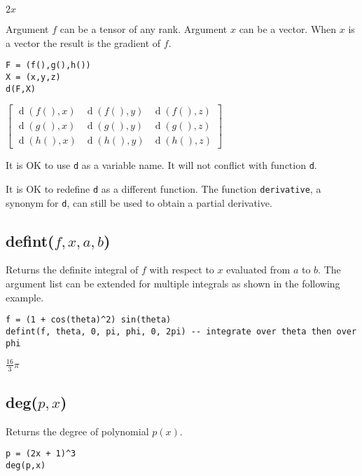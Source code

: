 \noindent
$2x$

\bigskip
\noindent
Argument $f$ can be a tensor of any rank.
Argument $x$ can be a vector.
When $x$ is a vector the result is the gradient of $f$.

{\color{blue}
\begin{verbatim}
F = (f(),g(),h())
X = (x,y,z)
d(F,X)
\end{verbatim}
}

\noindent
$\displaystyle \begin{bmatrix}
\operatorname{d}(f(),x) & \operatorname{d}(f(),y) &  \operatorname{d}(f(),z)\\
\operatorname{d}(g(),x) & \operatorname{d}(g(),y) &  \operatorname{d}(g(),z)\\
\operatorname{d}(h(),x) & \operatorname{d}(h(),y) &  \operatorname{d}(h(),z)
\end{bmatrix}
$

\bigskip
\noindent
It is OK to use {\tt d} as a variable name.
It will not conflict with function {\tt d}.

\bigskip
\noindent
It is OK to redefine {\tt d} as a different function.
The function {\tt derivative}, a synonym for {\tt d},
can still be used to obtain a partial derivative.

\subsection*{defint($f,x,a,b$)}

Returns the definite integral of $f$ with respect to $x$
evaluated from $a$ to $b$.
The argument list can be extended for multiple integrals
as shown in the following example.

{\color{blue}
\begin{verbatim}
f = (1 + cos(theta)^2) sin(theta)
defint(f, theta, 0, pi, phi, 0, 2pi) -- integrate over theta then over phi
\end{verbatim}
}

\noindent
$\tfrac{16}{3}\pi$

\subsection*{deg($p,x$)}

Returns the degree of polynomial $p(x)$.

{\color{blue}
\begin{verbatim}
p = (2x + 1)^3
deg(p,x)
\end{verbatim}
}

